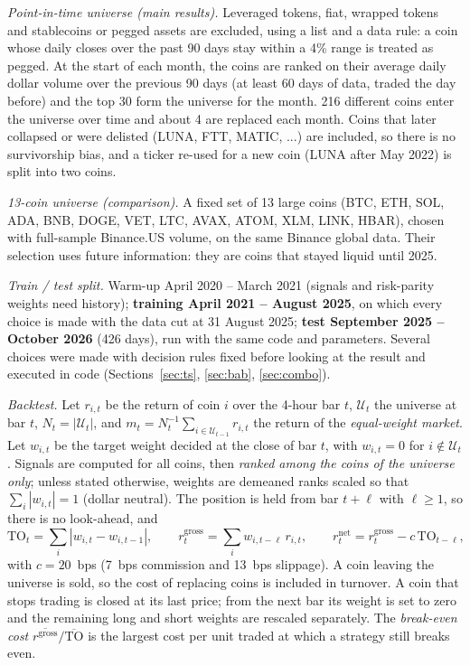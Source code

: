 \documentclass[aps,prl,onecolumn,superscriptaddress,nofootinbib]{revtex4-2}
\begin{document}
	\textit{Point-in-time universe (main results).} Leveraged tokens, fiat, wrapped tokens and stablecoins or pegged assets are excluded, using a list and a data rule: a coin whose daily closes over the past 90 days stay within a 4\% range is treated as pegged. At the start of each month, the coins are ranked on their average daily dollar volume over the previous 90 days (at least 60 days of data, traded the day before) and the top 30 form the universe for the month. 216 different coins enter the universe over time and about 4 are replaced each month. Coins that later collapsed or were delisted (LUNA, FTT, MATIC, ...) are included, so there is no survivorship bias, and a ticker re-used for a new coin (LUNA after May 2022) is split into two coins.

	\textit{13-coin universe (comparison).} A fixed set of 13 large coins (BTC, ETH, SOL, ADA, BNB, DOGE, VET, LTC, AVAX, ATOM, XLM, LINK, HBAR), chosen with full-sample Binance.US volume, on the same Binance global data. Their selection uses future information: they are coins that stayed liquid until 2025.

	\textit{Train / test split.} Warm-up April 2020 -- March 2021 (signals and risk-parity weights need history); \textbf{training April 2021 -- August 2025}, on which every choice is made with the data cut at 31 August 2025; \textbf{test September 2025 -- October 2026} (426 days), run with the same code and parameters. Several choices were made with decision rules fixed before looking at the result and executed in code (Sections~\ref{sec:ts}, \ref{sec:bab}, \ref{sec:combo}).

	\textit{Backtest.} Let $r_{i,t}$ be the return of coin $i$ over the 4-hour bar $t$, $\mathcal U_t$ the universe at bar $t$, $N_t = |\mathcal U_t|$, and $m_t = N_t^{-1}\sum_{i \in \mathcal U_{t-1}} r_{i,t}$ the return of the \emph{equal-weight market}. Let $w_{i,t}$ be the target weight decided at the close of bar $t$, with $w_{i,t} = 0$ for $i \notin \mathcal U_t$. Signals are computed for all coins, then \emph{ranked among the coins of the universe only}; unless stated otherwise, weights are demeaned ranks scaled so that $\sum_i |w_{i,t}| = 1$ (dollar neutral). The position is held from bar $t+\ell$ with $\ell \ge 1$, so there is no look-ahead, and
	\begin{equation}
		\mathrm{TO}_t = \sum_i \left| w_{i,t} - w_{i,t-1} \right|, \qquad
		r^{\mathrm{gross}}_t = \sum_i w_{i,t-\ell}\, r_{i,t}, \qquad
		r^{\mathrm{net}}_t = r^{\mathrm{gross}}_t - c\, \mathrm{TO}_{t-\ell} ,
		\label{eq:backtest}
	\end{equation}
	with $c = 20$~bps (7~bps commission and 13~bps slippage). A coin leaving the universe is sold, so the cost of replacing coins is included in turnover. A coin that stops trading is closed at its last price; from the next bar its weight is set to zero and the remaining long and short weights are rescaled separately. The \emph{break-even cost} $\overline{r^{\mathrm{gross}}} / \overline{\mathrm{TO}}$ is the largest cost per unit traded at which a strategy still breaks even.
\end{document}
